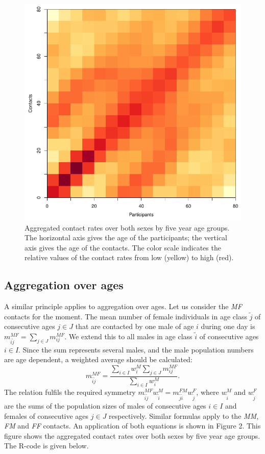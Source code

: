 \documentclass[aoas,preprint]{imsart}
\numberwithin{equation}{section}
\begin{document}
\begin{figure}
\centering
\includegraphics{fig_contact_matrix_aggregated.pdf}
\caption{Aggregated contact rates over both sexes by five year age groups. The horizontal axis gives the age of the participants; the vertical axis gives the age of the contacts. The color scale indicates the relative values of the contact rates from low (yellow) to high (red).}
\end{figure}

\subsection{Aggregation over ages}
A similar principle applies to aggregation over ages. Let us consider the \textit{MF} contacts for the moment. The mean number of female individuals in age class $\tilde{j}$ of consecutive ages $j \in J$ that are contacted by one male of age $i$ during one day is $m_\mathit{i\tilde{j}}^\mathit{MF} = \sum\limits_{j \in J} m_\mathit{ij}^\mathit{MF}$. We extend this to all males in age class $\tilde{i}$ of consecutive ages $i \in I$. Since the sum represents several males, and the male population numbers are age dependent, a weighted average should be calculated:
\begin{equation}
m_{\tilde{i}\tilde{j}}^\mathit{MF} = \frac{\sum\limits_{i \in I} w_i^M \sum\limits_{j \in J} m_\mathit{ij}^\mathit{MF}}{\sum\limits_{i \in I} w_i^M}.
\end{equation}
The relation fulfils the required symmetry $m_{\tilde{i}\tilde{j}}^\mathit{MF} w_{\tilde{i}}^M = m_{\tilde{j}\tilde{i}}^\mathit{FM} w_{\tilde{j}}^F$, where $w_{\tilde{i}}^M$ and $w_{\tilde{j}}^F$ are the sums of the population sizes of males of consecutive ages $i \in I$ and females of consecutive ages $j \in J$ respectively. Similar formulas apply to the \textit{MM}, \textit{FM} and \textit{FF} contacts. An application of both equations is shown in Figure 2. This figure shows the aggregated contact rates over both sexes by five year age groups. The R-code is given below.
\end{document}
